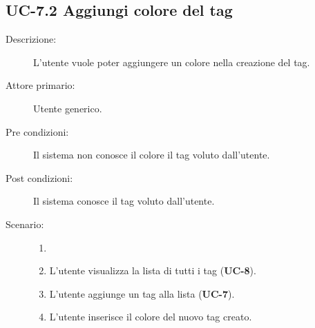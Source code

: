 \subsection{UC-7.2 Aggiungi colore del tag}
\begin{description}
    \item[Descrizione:] L’utente vuole poter aggiungere un colore nella creazione del tag.
    \item[Attore primario:] Utente generico.
    \item[Pre condizioni:] Il sistema non conosce il colore il tag voluto dall’utente.
    \item[Post condizioni:] Il sistema conosce il tag voluto dall’utente.
    \item[Scenario:]
    \begin{enumerate}
        \item[]
        \item L’utente visualizza la lista di tutti i tag (\textbf{UC-8}).
        \item L'utente aggiunge un tag alla lista (\textbf{UC-7}).
        \item L'utente inserisce il colore del nuovo tag creato.
    \end{enumerate}
\end{description}

